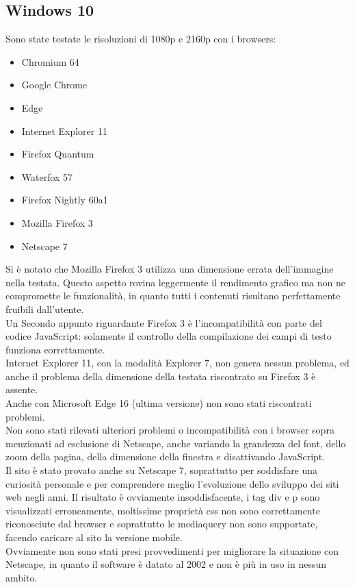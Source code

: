 \documentclass[openany, a4paper, 12pt]{report}
\begin{document}
				\subsection{Windows 10}
				Sono state testate le risoluzioni di 1080p e 2160p con i browsers:
				\begin{itemize}
					\item Chromium 64
					\item Google Chrome
					\item Edge
					\item Internet Explorer 11
					\item Firefox Quantum
					\item Waterfox 57
					\item Firefox Nightly 60a1
					\item Mozilla Firefox 3
					\item Netscape 7
				\end{itemize}
				Si è notato che Mozilla Firefox 3 utilizza una dimensione errata dell'immagine nella testata. Questo aspetto rovina leggermente il rendimento grafico ma non ne compromette le funzionalità, in quanto tutti i contenuti risultano perfettamente fruibili dall'utente.\\
				Un Secondo appunto riguardante Firefox 3 è l'incompatibilità con parte del codice JavaScript: solamente il controllo della compilazione dei campi di testo funziona correttamente.\\
				Internet Explorer 11, con la modalità Explorer 7, non genera nessun problema, ed anche il problema della dimensione della testata riscontrato su Firefox 3  è assente.\\
				Anche con Microsoft Edge 16 (ultima versione) non sono stati riscontrati problemi. \\
				Non sono stati rilevati ulteriori problemi o incompatibilità con i browser sopra menzionati ad esclusione di Netscape, anche variando la grandezza del font, dello zoom della pagina, della dimensione della finestra e disattivando JavaScript.\\
				Il sito è stato provato anche su Netscape 7, soprattutto per soddisfare una curiosità personale e per comprendere meglio l'evoluzione dello sviluppo dei siti web negli anni. Il risultato è ovviamente insoddisfacente, i tag div e p sono visualizzati erroneamente, moltissime proprietà css non sono correttamente riconosciute dal browser e soprattutto le mediaquery non sono supportate, facendo caricare al sito la versione mobile.\\
				Ovviamente non sono stati presi provvedimenti per migliorare la situazione con Netscape, in quanto il software è datato al 2002 e non è più in uso in nessun ambito.
				
\end{document}
